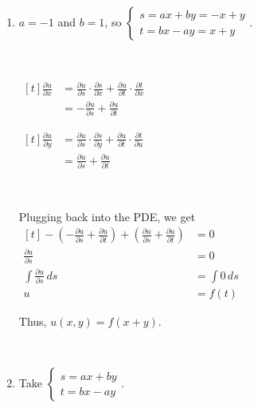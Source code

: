 \begin{enumerate}
    \item $a = -1$ and $b = 1$, so $\begin{cases}
        s = ax + by = -x + y \\
        t = bx - ay = x + y
    \end{cases}$.

    {~~~}

    \begin{minipage}[t]{0.45\linewidth}
        $\begin{aligned}[t]
            \frac{\partial u}{\partial x} 
             & = \frac{\partial u}{\partial s} \cdot \frac{\partial s}{\partial x} + \frac{\partial u}{\partial t} \cdot \frac{\partial t}{\partial x} \\
             & = -\frac{\partial u}{\partial s} + \frac{\partial u}{\partial t}
        \end{aligned}$
    \end{minipage}
    \begin{minipage}[t]{0.45\linewidth}
        $\begin{aligned}[t]
            \frac{\partial u}{\partial y} 
             & = \frac{\partial u}{\partial s} \cdot \frac{\partial s}{\partial y} + \frac{\partial u}{\partial t}\cdot \frac{\partial t}{\partial u}  \\ 
             & = \frac{\partial u}{\partial s} + \frac{\partial u}{\partial t}
        \end{aligned}$
    \end{minipage}

    {~~~}

    Plugging back into the PDE, we get $\begin{aligned}[t]
        -\left( -\frac{\partial u}{\partial s} + \frac{\partial u}{\partial t} \right) + \left( \frac{\partial u}{\partial s} + \frac{\partial u}{\partial t} \right) & = 0 \\
        \frac{\partial u}{\partial s} & = 0 \\
        \int \frac{\partial u}{\partial s} \,ds & = \int 0 \,ds \\
        u & = f(t)
    \end{aligned}$

    Thus, $u(x, y) = f(x + y)$. 
    
    {~~~}

    \item Take $\begin{cases} s = ax + by \\ t = bx - ay \end{cases}$. 


\end{enumerate}
